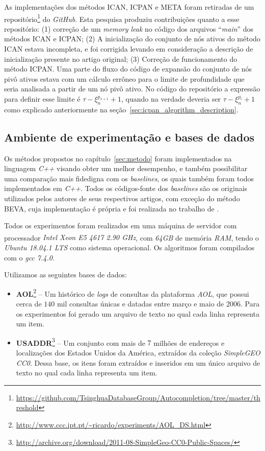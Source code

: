 As implementações dos métodos ICAN, ICPAN e META foram retiradas de um repositório\footnote{\url{https://github.com/TsinghuaDatabaseGroup/Autocompletion/tree/master/threshold}} do \textit{GitHub}. Esta pesquisa produziu contribuições quanto a esse repositório: (1) correção de um \textit{memory leak} no código dos arquivos ``\textit{main}'' dos métodos ICAN e ICPAN; (2) A inicialização do conjunto de nós ativos do método ICAN estava incompleta, e foi corrigida levando em consideração a descrição de inicialização presente no artigo original; (3) Correção de funcionamento do método ICPAN. Uma parte do fluxo do código de expansão do conjunto de nós pivô ativos estava com um cálculo errôneo para o limite de profundidade que seria analisada a partir de um nó pivô ativo. No código do repositório a expressão para definir esse limite é $\tau - \xi_{n}^{p_{x+1}} + 1$, quando na verdade deveria ser $\tau - \xi_{n}^{p_{i}} + 1$ como explicado anteriormente na seção~\ref{sec:icpan_algorithm_description}. 

\subsection{Ambiente de experimentação e bases de dados}

Os métodos propostos no capítulo~\ref{sec:metodo} foram implementados na linguagem \textit{C++} visando obter um melhor desempenho, e também possibilitar uma comparação mais fidedigna com os \textit{baselines}, os quais também foram todos implementados em \textit{C++}. Todos os códigos-fonte dos \textit{baselines} são os originais utilizados pelos autores de seus respectivos artigos, com exceção do método BEVA, cuja implementação é própria e foi realizada no trabalho de \cite{berg2020}.

Todos os experimentos foram realizados em uma máquina de servidor com processador \textit{Intel \textsuperscript{\textregistered} Xeon E5 4617 2.90 GHz}, com \textit{64GB} de memória \textit{RAM}, tendo o \textit{Ubuntu 18.04.1 LTS} como sistema operacional. Os algoritmos foram compilados com o \textit{gcc 7.4.0}.

Utilizamos as seguintes bases de dados:

\begin{itemize}
    \item \textbf{AOL}\footnote{\url{http://www.ccc.ipt.pt/~ricardo/experiments/AOL_DS.html}} -- Um histórico de \textit{logs} de consultas da plataforma \textit{AOL}, que possui cerca de $140$ mil consultas únicas e datadas entre março e maio de 2006. Para os experimentos foi gerado um arquivo de texto no qual cada linha representa um item. 
    \item \textbf{USADDR}\footnote{\url{http://archive.org/download/2011-08-SimpleGeo-CC0-Public-Spaces/}} -- Um conjunto com mais de $7$ milhões de endereços e localizações dos Estados Unidos da América, extraídos da coleção \textit{SimpleGEO CC0}. Dessa base, os itens foram extraídos e inseridos em um único arquivo de texto no qual cada linha representa um item.    
\end{itemize} 
 

